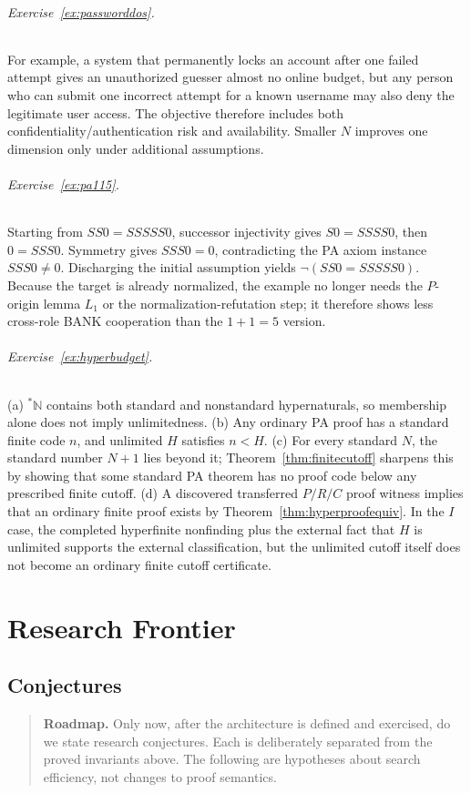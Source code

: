 \documentclass[11pt,openany]{book}
\theoremstyle{definition}
\theoremstyle{remark}
\newenvironment{roadmap}{\begin{quote}\small\color{deepblue}\textbf{Roadmap.} }{\end{quote}}
\newcommand{\N}{\mathbb{N}}
\begin{document}
\paragraph{Exercise~\ref{ex:passworddos}.}
For example, a system that permanently locks an account after one failed attempt gives an unauthorized guesser almost no online budget, but any person who can submit one incorrect attempt for a known username may also deny the legitimate user access. The objective therefore includes both confidentiality/authentication risk and availability. Smaller $N$ improves one dimension only under additional assumptions.


\paragraph{Exercise~\ref{ex:pa115}.}
Starting from $SS0=SSSSS0$, successor injectivity gives $S0=SSSS0$, then $0=SSS0$. Symmetry gives $SSS0=0$, contradicting the PA axiom instance $SSS0\neq0$. Discharging the initial assumption yields $\neg(SS0=SSSSS0)$. Because the target is already normalized, the example no longer needs the $P$-origin lemma $L_1$ or the normalization-refutation step; it therefore shows less cross-role BANK cooperation than the $1+1=5$ version.

\paragraph{Exercise~\ref{ex:hyperbudget}.}
(a) ${}^*\N$ contains both standard and nonstandard hypernaturals, so membership alone does not imply unlimitedness. (b) Any ordinary PA proof has a standard finite code $n$, and unlimited $H$ satisfies $n<H$. (c) For every standard $N$, the standard number $N+1$ lies beyond it; Theorem~\ref{thm:finitecutoff} sharpens this by showing that some standard PA theorem has no proof code below any prescribed finite cutoff. (d) A discovered transferred $P/R/C$ proof witness implies that an ordinary finite proof exists by Theorem~\ref{thm:hyperproofequiv}. In the $I$ case, the completed hyperfinite nonfinding plus the external fact that $H$ is unlimited supports the external classification, but the unlimited cutoff itself does not become an ordinary finite cutoff certificate.

\part{Research Frontier}

\chapter{Conjectures}
\begin{roadmap}
Only now, after the architecture is defined and exercised, do we state research conjectures. Each is deliberately separated from the proved invariants above. The following are hypotheses about search efficiency, not changes to proof semantics.
\end{roadmap}
\end{document}
